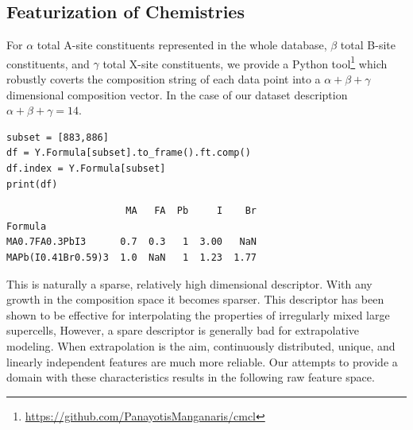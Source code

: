 \documentclass[aip, jmp, amsmath, amssymb, nofootinbib]{revtex4-2}
\begin{document}
\subsection*{Featurization of Chemistries}
\label{sec:org6fe3a2d}
For \(\alpha\) total A-site constituents represented in the whole
database, \(\beta\) total B-site constituents, and \(\gamma\) total X-site
constituents, we provide a Python tool\footnote{\url{https://github.com/PanayotisManganaris/cmcl}\label{org9f1ad34}} which robustly coverts
the composition string of each data point into a \(\alpha + \beta +
\gamma\) dimensional composition vector. In the case of our dataset
description\cite{yang-2022-high-throug} \(\alpha + \beta + \gamma =
14\). 

\begin{lstlisting}
subset = [883,886]
df = Y.Formula[subset].to_frame().ft.comp()
df.index = Y.Formula[subset]
print(df)
\end{lstlisting}

\begin{verbatim}
                     MA   FA  Pb     I    Br
Formula                                     
MA0.7FA0.3PbI3      0.7  0.3   1  3.00   NaN
MAPb(I0.41Br0.59)3  1.0  NaN   1  1.23  1.77
\end{verbatim}

This is naturally a sparse, relatively high dimensional
descriptor. With any growth in the composition space it becomes
sparser. This descriptor has been shown to be effective for
interpolating the properties of irregularly mixed large
supercells\cite{mannodi-kanakkithodi-2022-data-driven}, However, a
spare descriptor is generally bad for extrapolative
modeling\cite{ghiringhelli-2015-big-data}. When extrapolation is the
aim, continuously distributed, unique, and linearly independent
features are much more reliable\cite{lux-2020-inter-spars}. Our
attempts to provide a domain with these characteristics results in the
following raw feature space.
\end{document}
